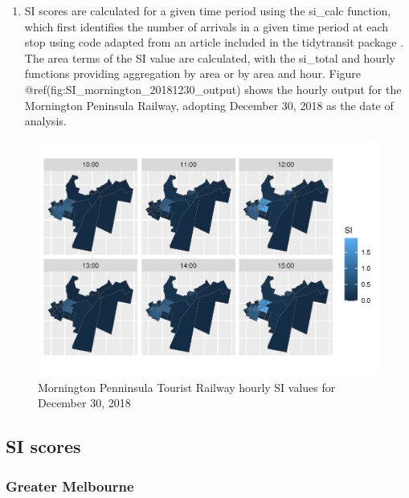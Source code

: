 \documentclass[preprint, 3p,
authoryear]{elsarticle} %
\providecommand{\tightlist}{%
  \setlength{\itemsep}{0pt}\setlength{\parskip}{0pt}}
\begin{document}
\begin{enumerate}
\def\labelenumi{(\arabic{enumi})}
\setcounter{enumi}{4}
\tightlist
\item
  SI scores are calculated for a given time period using the si\_calc
  function, which first identifies the number of arrivals in a given
  time period at each stop using code adapted from an article included
  in the tidytransit package \citep{tidytransit_departure_timetable}.
  The area terms of the SI value are calculated, with the si\_total and
  hourly functions providing aggregation by area or by area and hour.
  Figure @ref(fig:SI\_mornington\_20181230\_output) shows the hourly
  output for the Mornington Peninsula Railway, adopting December 30,
  2018 as the date of analysis.
\end{enumerate}

\begin{figure}
\centering
\includegraphics{Leveraging_GTFS_to_assess_transit_supply_Transport_Geography_files/figure-latex/SI_mornington_20181230_output-1.pdf}
\caption{Mornington Penninsula Tourist Railway hourly SI values for
December 30, 2018}
\end{figure}

\subsection{SI scores}\label{si-scores}

\subsubsection{Greater Melbourne}\label{greater-melbourne}
\end{document}
